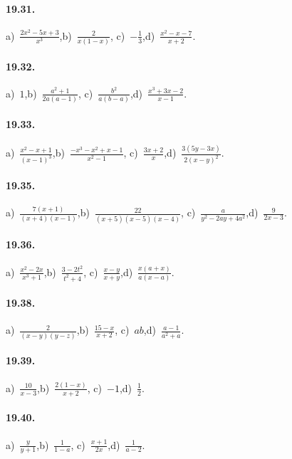 \paragraph{19.31.}
a)~$\frac{2x^{2}-5x+3}{x^{3}}$,\quad b)~$\frac{2}{x(1-x)}$, \quad c)~$-{\frac{1}{3}}$,\quad d)~$\frac{x^{2}-x-7}{x+2}$.

\paragraph{19.32.}
a)~$1$,\quad b)~$\frac{a^{2}+1}{2a(a-1)}$, \quad c)~$\frac{b^{2}}{a(b-a)}$,\quad d)~$\frac{x^{3}+3x-2}{x-1}$.

\paragraph{19.33.}
a)~$\frac{x^{2}-x+1}{(x-1)^{3}}$,\quad b)~$\frac{-x^{3}-x^{2}+x-1}{x^{2}-1}$, \quad c)~$\frac{3x+2}{x}$,\quad d)~$\frac{3(5y-3x)}{2(x-y)^{2}}$.

\paragraph{19.35.}
a)~$\frac{7(x+1)}{(x+4)(x-1)}$,\quad b)~$\frac{22}{(x+5)(x-5)(x-4)}$, \quad c)~$\frac{a}{y^{2}-2ay+4a^{2}}$,\quad d)~$\frac{9}{2x-3}$.

\paragraph{19.36.}
a)~$\frac{x^{2}-2x}{x^{3}+1}$,\quad b)~$\frac{3-2t^{2}}{t^{2}+4}$, \quad c)~$\frac{x-y}{x+y}$,\quad d)~$\frac{x(a+x)}{a(x-a)}$.

\paragraph{19.38.}
a)~$\frac{2}{(x-y)(y-z)}$,\quad b)~$\frac{15-x}{x+2}$, \quad c)~$ab$,\quad d)~$\frac{a-1}{a^{2}+a}$.

\paragraph{19.39.}
a)~$\frac{10}{x-3}$,\quad b)~$\frac{2(1-x)}{x+2}$, \quad c)~$-1$,\quad d)~$\frac{1}{2}$.

\paragraph{19.40.}
a)~$\frac{y}{y+1}$,\quad b)~$\frac{1}{1-a}$, \quad c)~$\frac{x+1}{2x}$,\quad d)~$\frac{1}{a-2}$.

